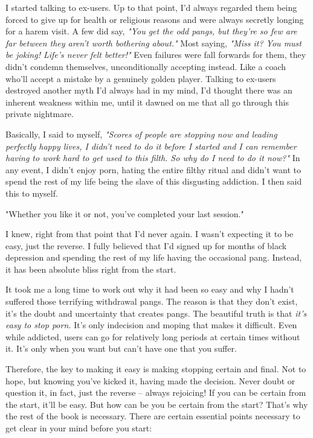 \documentclass[easypeasy]{subfiles}
\begin{document}
I started talking to ex-users. Up to that point, I'd always regarded them being forced to give up for health or religious reasons and were always secretly longing for a harem visit. A few did say, \textit{"You get the odd pangs, but they're so few are far between they aren't worth bothering about."} Most saying, \textit{"Miss it? You must be joking! Life's never felt better!"} Even failures were fall forwards for them, they didn't condemn themselves, unconditionally accepting instead. Like a coach who'll accept a mistake by a genuinely golden player. Talking to ex-users destroyed another myth I'd always had in my mind, I'd thought there was an inherent weakness within me, until it dawned on me that all go through this private nightmare.

Basically, I said to myself, \textit{"Scores of people are stopping now and leading perfectly happy lives, I didn't need to do it before I started and I can remember having to work hard to get used to this filth. So why do I need to do it now?"} In any event, I didn't enjoy porn, hating the entire filthy ritual and didn't want to spend the rest of my life being the slave of this disgusting addiction. I then said this to myself.

  {\Large "Whether you like it or not, you've completed your last session."}

I knew, right from that point that I'd never again. I wasn't expecting it to be easy, just the reverse. I fully believed that I'd signed up for months of black depression and spending the rest of my life having the occasional pang. Instead, it has been absolute bliss right from the start.

It took me a long time to work out why it had been so easy and why I hadn't suffered those terrifying withdrawal pangs. The reason is that they don't exist, it's the doubt and uncertainty that creates pangs. The beautiful truth is that \textit{it's easy to stop porn.} It's only indecision and moping that makes it difficult. Even while addicted, users can go for relatively long periods at certain times without it. It's only when you want but can't have one that you suffer.

Therefore, the key to making it easy is making stopping certain and final. Not to hope, but knowing you've kicked it, having made the decision. Never doubt or question it, in fact, just the reverse -- always rejoicing! If you can be certain from the start, it'll be easy. But how can be you be certain from the start? That's why the rest of the book is necessary. There are certain essential points necessary to get clear in your mind before you start:
\end{document}
